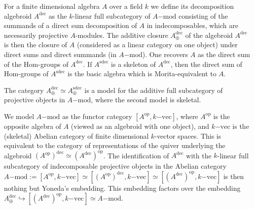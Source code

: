 For a finite dimensional algebra $A$ over a field $k$ we define its decomposition algebroid $A^\mathrm{dec}$ as the $k$-linear full subcategory of $A\mathrm{-mod}$ consisting of the summands of a direct sum decomposition of $A$ in indecomposables, which are necessarily projective $A$-modules. The additive closure $A^\mathrm{dec}_\oplus$ of the algebroid $A^\mathrm{dec}$ is then the closure of $A$ (considered as a linear category on one object) under direct sums and direct summands (in $A\mathrm{-mod}$). One recovers $A$ as the direct sum of the $\mathrm{Hom}$-groups of $A^\mathrm{dec}$. If $A^\mathrm{sdec}$ is a skeleton of $A^\mathrm{dec}$, then the direct sum of $\mathrm{Hom}$-groups of $A^\mathrm{sdec}$ is the basic algebra which is Morita-equivalent to $A$.

The category $A^\mathrm{dec}_\oplus \simeq A^\mathrm{sdec}_\oplus$ is a model for the additive full subcategory of projective objects in $A\mathrm{-mod}$, where the second model is skeletal.

We model $A\mathrm{-mod}$ as the functor category $[A^\mathrm{op}, k\mathrm{-vec}]$, where $A^\mathrm{op}$ is the opposite algebra of $A$ (viewed as an algebroid with one object), and $k\mathrm{-vec}$ is the (skeletal) Abelian category of finite dimensional $k$-vector spaces. This is equivalent to the category of representations of the quiver underlying the algebroid $(A^\mathrm{op})^\mathrm{dec} \simeq (A^\mathrm{dec})^\mathrm{op}$. The identification of $A^\mathrm{dec}$ with the $k$-linear full subcategory of indecomposable projective objects in the Abelian category $A\mathrm{-mod} := [A^\mathrm{op}, k\mathrm{-vec}] \simeq [(A^\mathrm{op})^\mathrm{dec}, k\mathrm{-vec}] \simeq [(A^\mathrm{dec})^\mathrm{op}, k\mathrm{-vec}]$ is then nothing but Yoneda's embedding. This embedding factors over the embedding $A^\mathrm{dec}_\oplus \hookrightarrow [(A^\mathrm{dec})^\mathrm{op}, k\mathrm{-vec}] \simeq A\mathrm{-mod}$.









